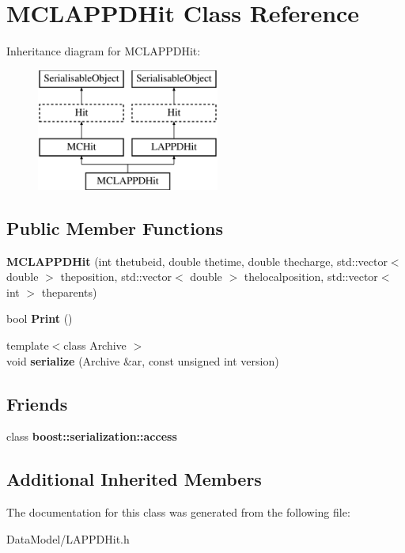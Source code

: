 \hypertarget{classMCLAPPDHit}{\section{M\-C\-L\-A\-P\-P\-D\-Hit Class Reference}
\label{classMCLAPPDHit}
}
Inheritance diagram for M\-C\-L\-A\-P\-P\-D\-Hit\-:\begin{figure}[H]
\begin{center}
\leavevmode
\includegraphics[height=4.000000cm]{classMCLAPPDHit}
\end{center}
\end{figure}
\subsection*{Public Member Functions}
\begin{DoxyCompactItemize}
\item 
\hypertarget{classMCLAPPDHit_ae070e6fd084dffe72b24257fb10eae53}{{\bfseries M\-C\-L\-A\-P\-P\-D\-Hit} (int thetubeid, double thetime, double thecharge, std\-::vector$<$ double $>$ theposition, std\-::vector$<$ double $>$ thelocalposition, std\-::vector$<$ int $>$ theparents)}\label{classMCLAPPDHit_ae070e6fd084dffe72b24257fb10eae53}

\item 
\hypertarget{classMCLAPPDHit_a90639fe126043eeb4222860265d0e3c5}{bool {\bfseries Print} ()}\label{classMCLAPPDHit_a90639fe126043eeb4222860265d0e3c5}

\item 
\hypertarget{classMCLAPPDHit_a1f0112b487a84fdc753c76bd3429bc06}{{\footnotesize template$<$class Archive $>$ }\\void {\bfseries serialize} (Archive \&ar, const unsigned int version)}\label{classMCLAPPDHit_a1f0112b487a84fdc753c76bd3429bc06}

\end{DoxyCompactItemize}
\subsection*{Friends}
\begin{DoxyCompactItemize}
\item 
\hypertarget{classMCLAPPDHit_ac98d07dd8f7b70e16ccb9a01abf56b9c}{class {\bfseries boost\-::serialization\-::access}}\label{classMCLAPPDHit_ac98d07dd8f7b70e16ccb9a01abf56b9c}

\end{DoxyCompactItemize}
\subsection*{Additional Inherited Members}


The documentation for this class was generated from the following file\-:\begin{DoxyCompactItemize}
\item 
Data\-Model/L\-A\-P\-P\-D\-Hit.\-h\end{DoxyCompactItemize}
